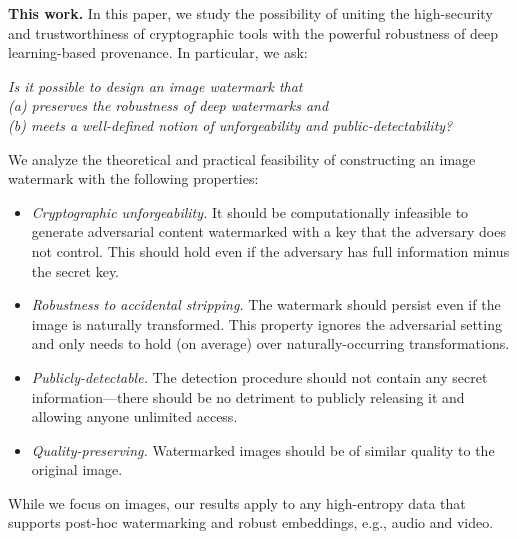 \documentclass[12pt]{article}
\begin{document}
\textbf{This work.} 
In this paper, we study the possibility of uniting the high-security and trustworthiness of cryptographic tools with the powerful robustness of deep learning-based provenance.
In particular, we ask:
\begin{center}
    \textit{Is it possible to design an image watermark that\\(a) preserves the robustness of deep watermarks and\\(b) meets a well-defined notion of unforgeability and public-detectability?}
\end{center}

We analyze the theoretical and practical feasibility of constructing an image watermark with the following properties:
\begin{itemize}
    \item \textit{Cryptographic unforgeability.}
    It should be computationally infeasible to generate adversarial content watermarked with a key that the adversary does not control.
    This should hold even if the adversary has full information minus the secret key.
    
    \item \textit{Robustness to accidental stripping.}
    The watermark should persist even if the image is naturally transformed. This property ignores the adversarial setting and only needs to hold (on average) over naturally-occurring transformations.
    
    \item \textit{Publicly-detectable.} The detection procedure should not contain any secret information---there should be no detriment to publicly releasing it and allowing anyone unlimited access.
    
    \item \textit{Quality-preserving.} Watermarked images should be of similar quality to the original image.
\end{itemize}

While we focus on images, our results apply to any high-entropy data that supports post-hoc watermarking and robust embeddings, e.g., audio and video.
\end{document}
